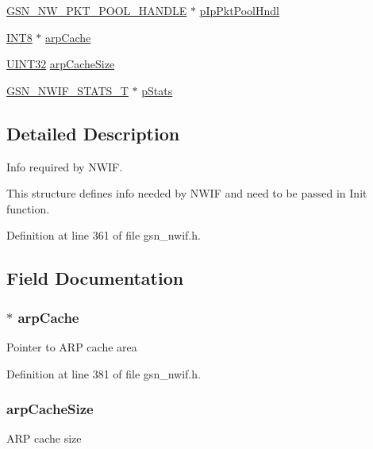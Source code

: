 \begin{DoxyCompactItemize}
\item 
\hyperlink{a00532_afccc5835aa5e2916600678de68186848}{GSN\_\-NW\_\-PKT\_\-POOL\_\-HANDLE} $\ast$ \hyperlink{a00169_a4cdcdc7a80f5e9b124e3cdff24cdcaec}{pIpPktPoolHndl}
\item 
\hyperlink{a00660_ga307b8734c020247f6bac4fcde0dcfbb9}{INT8} $\ast$ \hyperlink{a00169_a2ae59862bdce0fe08b549447e6b710be}{arpCache}
\item 
\hyperlink{a00660_gae1e6edbbc26d6fbc71a90190d0266018}{UINT32} \hyperlink{a00169_a5c94de6f5334be42b93b4d8a8c751253}{arpCacheSize}
\item 
\hyperlink{a00176}{GSN\_\-NWIF\_\-STATS\_\-T} $\ast$ \hyperlink{a00169_aec0dbb062c1551edeb82d3a45c451e01}{pStats}
\end{DoxyCompactItemize}


\subsection{Detailed Description}
Info required by NWIF. 

This structure defines info needed by NWIF and need to be passed in Init function. 

Definition at line 361 of file gsn\_\-nwif.h.



\subsection{Field Documentation}
\hypertarget{a00169_a2ae59862bdce0fe08b549447e6b710be}{
\subsubsection[{arpCache}]{$\ast$ {\bf arpCache}}}
\label{a00169_a2ae59862bdce0fe08b549447e6b710be}
Pointer to ARP cache area 

Definition at line 381 of file gsn\_\-nwif.h.

\hypertarget{a00169_a5c94de6f5334be42b93b4d8a8c751253}{
\subsubsection[{arpCacheSize}]{ {\bf arpCacheSize}}}
\label{a00169_a5c94de6f5334be42b93b4d8a8c751253}
ARP cache size 

